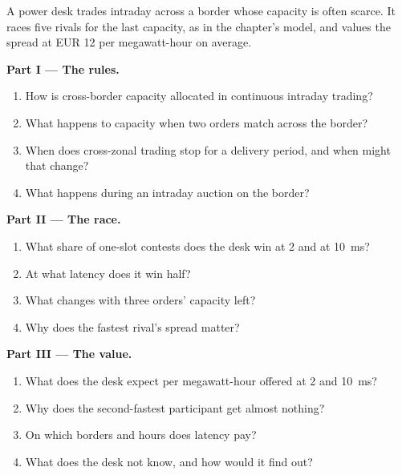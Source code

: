 \begin{problem}\label{pb:nw:power-commodities-and-betting-connectivity:1}
A power desk trades intraday across a border whose capacity is often scarce. It races five rivals for the last capacity, as in the
chapter's model, and values the spread at EUR 12 per megawatt-hour on average.

\medskip\noindent\textbf{Part I --- The rules.}
\begin{enumerate}
\item How is cross-border capacity allocated in continuous intraday trading?
\item What happens to capacity when two orders match across the border?
\item When does cross-zonal trading stop for a delivery period, and when might that change?
\item What happens during an intraday auction on the border?
\end{enumerate}

\medskip\noindent\textbf{Part II --- The race.}
\begin{enumerate}[resume]
\item What share of one-slot contests does the desk win at 2 and at \qty{10}{\milli\second}?
\item At what latency does it win half?
\item What changes with three orders' capacity left?
\item Why does the fastest rival's spread matter?
\end{enumerate}

\medskip\noindent\textbf{Part III --- The value.}
\begin{enumerate}[resume]
\item What does the desk expect per megawatt-hour offered at 2 and \qty{10}{\milli\second}?
\item Why does the second-fastest participant get almost nothing?
\item On which borders and hours does latency pay?
\item What does the desk not know, and how would it find out?
\end{enumerate}


\end{problem}
